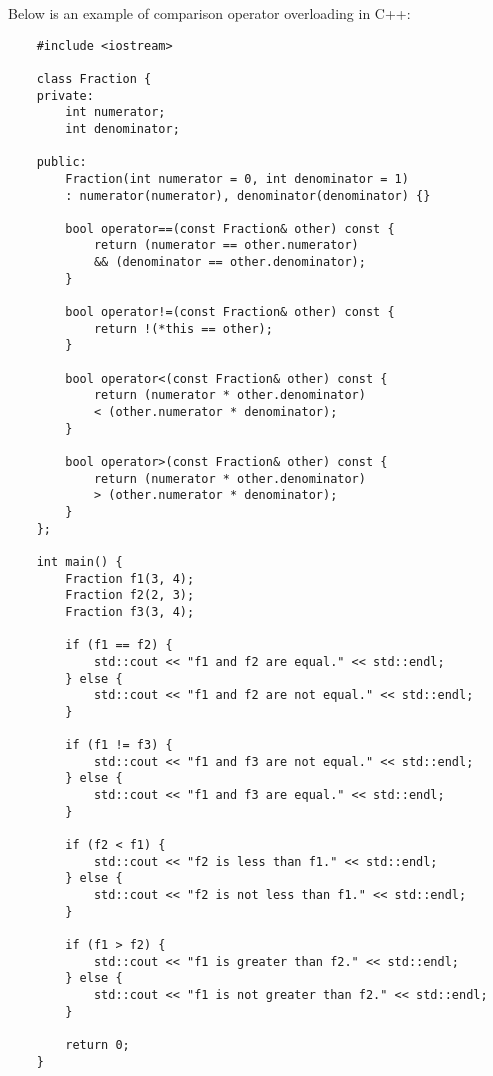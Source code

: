 \begin{solution}
    Below is an example of comparison operator overloading in C++: \\
    \horizontalline
    \begin{verbatim}
    #include <iostream>

    class Fraction {
    private:
        int numerator;
        int denominator;
    
    public:
        Fraction(int numerator = 0, int denominator = 1) 
        : numerator(numerator), denominator(denominator) {}
    
        bool operator==(const Fraction& other) const {
            return (numerator == other.numerator) 
            && (denominator == other.denominator);
        }
    
        bool operator!=(const Fraction& other) const {
            return !(*this == other);
        }
    
        bool operator<(const Fraction& other) const {
            return (numerator * other.denominator) 
            < (other.numerator * denominator);
        }
    
        bool operator>(const Fraction& other) const {
            return (numerator * other.denominator) 
            > (other.numerator * denominator);
        }
    };
    
    int main() {
        Fraction f1(3, 4);
        Fraction f2(2, 3);
        Fraction f3(3, 4);
    
        if (f1 == f2) {
            std::cout << "f1 and f2 are equal." << std::endl;
        } else {
            std::cout << "f1 and f2 are not equal." << std::endl;
        }
    
        if (f1 != f3) {
            std::cout << "f1 and f3 are not equal." << std::endl;
        } else {
            std::cout << "f1 and f3 are equal." << std::endl;
        }
    
        if (f2 < f1) {
            std::cout << "f2 is less than f1." << std::endl;
        } else {
            std::cout << "f2 is not less than f1." << std::endl;
        }
    
        if (f1 > f2) {
            std::cout << "f1 is greater than f2." << std::endl;
        } else {
            std::cout << "f1 is not greater than f2." << std::endl;
        }
    
        return 0;
    }
    \end{verbatim}
    

\end{solution}
